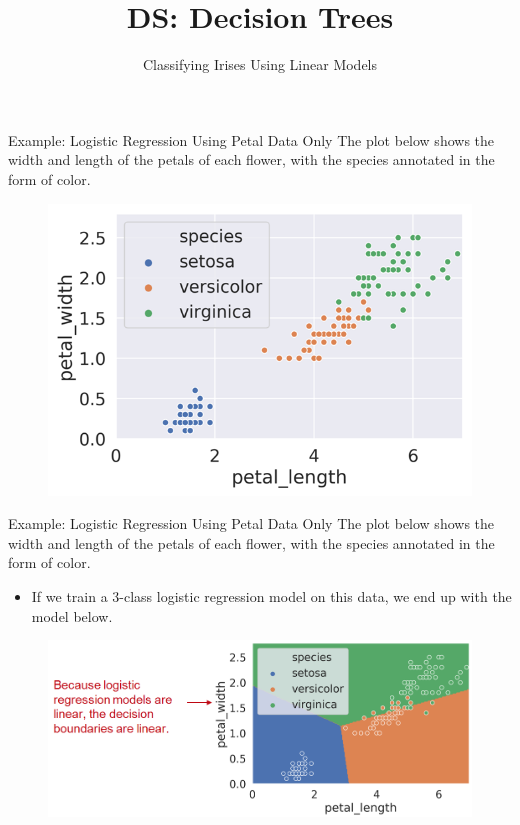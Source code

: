 \documentclass[aspectratio=169]{../latex_main/tntbeamer}  %
\title[Introduction]{DS: Decision Trees}
\subtitle{Classifying Irises Using Linear Models}
\begin{document}
	
	\maketitle
	\begin{frame}{Example: Logistic Regression Using Petal Data Only}
	    The plot below shows the width and length of the petals of each flower, with the species annotated in the form of color.
	    \begin{figure}
	        \centering
	        \includegraphics[scale=.75]{Bild3}
	    \end{figure}
	\end{frame}
	
	\begin{frame}{Example: Logistic Regression Using Petal Data Only}
	    The plot below shows the width and length of the petals of each flower, with the species annotated in the form of color.
	    \begin{itemize}
	        \item If we train a 3-class logistic regression model on this data, we end up with the model below.
	    \end{itemize}
	    \begin{figure}
	        \centering
	        \includegraphics[scale=.4]{Bild4}
	    \end{figure}
	\end{frame}
\end{document}
